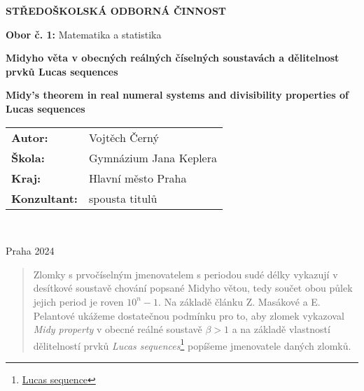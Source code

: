 \documentclass{article}
\theoremstyle{definition}
\theoremstyle{definition}
\theoremstyle{remark}
\numberwithin{equation}{section}
\begin{document}
\begin{titlepage}
	\begin{center}

		\vspace{15mm}

		{\Large{\textbf{STŘEDOŠKOLSKÁ ODBORNÁ ČINNOST}}}\\

		\vspace{3mm}

		{\large{\textbf{Obor č. 1:} Matematika a statistika}}\\

		\vspace{80mm}

		{\LARGE{\textbf{Midyho věta v obecných reálných číselných soustavách a dělitelnost prvků Lucas sequences}}}\\

		\vspace{10mm}

		{\LARGE{\textbf{Midy's theorem in real numeral systems and divisibility properties of Lucas sequences }}}\\

		\vspace{80mm}

		\large{
			\begin{tabular}{l l}
				\textbf{Autor:}      & Vojtěch Černý          \\
				\textbf{Škola:}      & Gymnázium Jana Keplera \\
				\textbf{Kraj:}       & Hlavní město Praha     \\
				\textbf{Konzultant:} & spousta titulů
			\end{tabular}
		}\\

		\vspace{5mm}

		{\large{ Praha 2024\\}}
	\end{center}
\end{titlepage}

\newpage
\thispagestyle{empty}
\tableofcontents
\listoftables
\listoffigures
{}

\begin{abstract}
	Zlomky s prvočíselným jmenovatelem s periodou sudé délky vykazují v desítkové soustavě chování popsané Midyho větou, tedy součet obou půlek jejich period je roven $10^n - 1$. Na základě článku Z. Masákové a E. Pelantové ukážeme dostatečnou podmínku pro to, aby zlomek vykazoval \textit{Midy property} v obecné reálné soustavě $\beta > 1$ a na základě vlastností dělitelností prvků \textit{Lucas sequences}\footnote{\href{https://en.wikipedia.org/wiki/Lucas_sequence}{Lucas sequence}} popíšeme jmenovatele daných zlomků.
\end{abstract}
\end{document}
